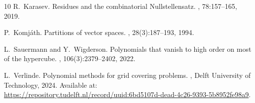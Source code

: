 \documentclass[usenames,dvipsnames, 11pt]{article}
\numberwithin{thm}{section}
\theoremstyle{definition}
\theoremstyle{definition}
\theoremstyle{definition}
\newcommand{\1}{\mathbf{1}}
\begin{document}
\begin{thebibliography}{10}
R.~Karasev.
\newblock Residues and the combinatorial {N}ullstellensatz.
, 78:157--165, 2019.

P.~Komj\'{a}th.
\newblock Partitions of vector spaces.
, 28(3):187--193, 1994.

L.~Sauermann and Y.~Wigderson.
\newblock Polynomials that vanish to high order on most of the hypercube.
, 106(3):2379--2402, 2022.

L.~Verlinde.
\newblock Polynomial methods for grid covering problems.
, Delft University of Technology, 2024.
\newblock Available at: \url{https://repository.tudelft.nl/record/uuid:6bd5107d-dead-4c26-9393-5b8952fe98a9}.

\end{thebibliography}
\end{document}
